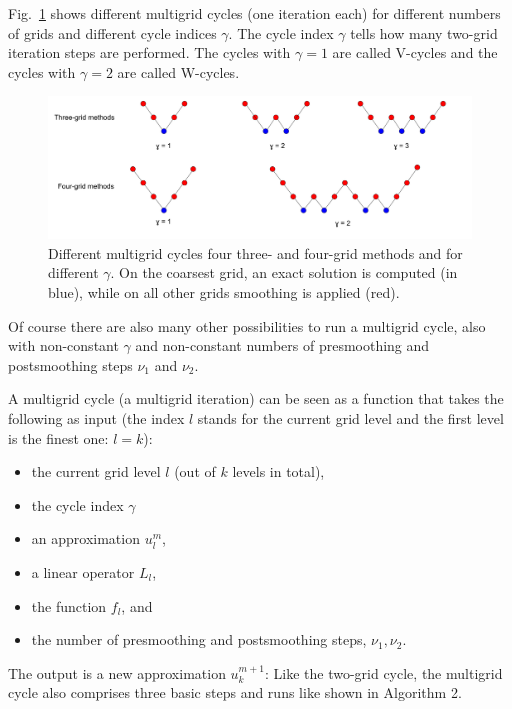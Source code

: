 Fig.~\ref{fig:mg_cycles} shows different multigrid cycles (one iteration each) for different numbers of grids and different cycle indices $\gamma$. The cycle index $\gamma$ tells how many two-grid iteration steps are performed. The cycles with $\gamma = 1$ are called V-cycles and the cycles with $\gamma = 2$ are called W-cycles.

\begin{figure}[tbp]
	\centering
	\includegraphics[width=1.07\textwidth]{chapters/chapter02/mg_cylces}
	\caption{Different multigrid cycles four three- and four-grid methods and for different $\gamma$. On the coarsest grid, an exact solution is computed (in blue), while on all other grids smoothing is applied (red).}
	\label{fig:mg_cycles}
\end{figure}

Of course there are also many other possibilities to run a multigrid cycle, also with non-constant $\gamma$ and non-constant numbers of presmoothing and postsmoothing steps $\nu_1$ and $\nu_2$.


A multigrid cycle (a multigrid iteration) can be seen as a function that takes the following as input (the index $l$ stands for the current grid level and the first level is  the finest one: $l = k$): 
\begin{itemize}
\item the current grid level $l$ (out of $k$ levels in total),
\item the cycle index $\gamma$
\item an approximation $u_l^{m}$, 
\item a linear operator $L_l$,
\item the function $f_l$, and 
\item the number of presmoothing and postsmoothing steps, $\nu_1, \nu_2$. 
\end{itemize}
The output is a new approximation $u_k^{m+1}$:
Like the two-grid cycle, the multigrid cycle also comprises three basic steps and runs like shown in Algorithm 2. 
\vspace{5mm}

